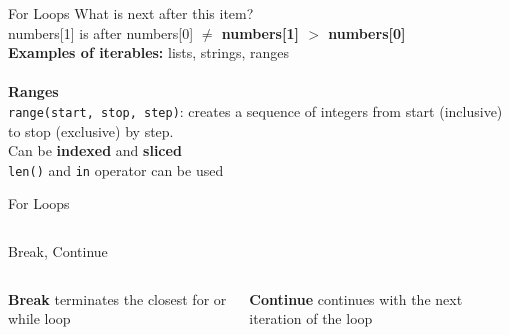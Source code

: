         \begin{frame}{For Loops}
            \LARGE
            What is next after this item?\\
            numbers[1] is after numbers[0] \textbf{$\neq$ numbers[1] $>$ numbers[0]}\\
            \textbf{Examples of iterables:} lists, strings, ranges\\
            \huge
            \\
            \textbf{Ranges}\\
            \LARGE
            \texttt{range(start, stop, step)}: creates a sequence of integers from start (inclusive) to stop (exclusive) by step.\\
            Can be \textbf{indexed} and \textbf{sliced}\\
            \texttt{len()} and \texttt{in} operator can be used
        \end{frame}

        \begin{frame}{For Loops}
            \inputminted[frame=single,framesep=2pt]{python3}{code-examples/for_loops.py}
        \end{frame}

        \begin{frame}{Break, Continue}
            \begin{columns}
                \begin{column}{0.5\textwidth}
                    \textbf{Break}
                    terminates the closest for or while loop
                    \bigskip  
                    \inputminted[frame=single,framesep=2pt]{python3}{../Lecture3/code-examples/break1.py}
                    \inputminted[frame=single,framesep=2pt]{python3}{../Lecture3/code-examples/break2.py}
                \end{column}
                \begin{column}{0.5\textwidth}
                    \textbf{Continue}
                    continues with the next iteration of the loop
                    \bigskip  
                    \inputminted[frame=single,framesep=2pt]{python3}{../Lecture3/code-examples/continue1.py}
                    \inputminted[frame=single,framesep=2pt]{python3}{../Lecture3/code-examples/continue2.py}
                \end{column} 
            \end{columns}
        \end{frame}
        
